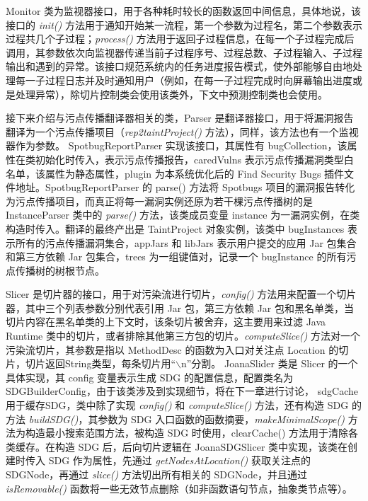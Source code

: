 Monitor 类为监视器接口，用于各种耗时较长的函数返回中间信息，具体地说，该接口的 \textit{init()} 方法用于通知开始某一流程，第一个参数为过程名，第二个参数表示过程共几个子过程；\textit{process()} 方法用于返回子过程信息，在每一个子过程完成后调用，其参数依次向监视器传递当前子过程序号、过程总数、子过程输入、子过程输出和遇到的异常。该接口规范系统内的任务进度报告模式，使外部能够自由地处理每一子过程日志并及时通知用户（例如，在每一子过程完成时向屏幕输出进度或是处理异常），除切片控制类会使用该类外，下文中预测控制类也会使用。

接下来介绍与污点传播翻译器相关的类，Parser 是翻译器接口，用于将漏洞报告翻译为一个污点传播项目（\textit{rep2taintProject()} 方法），同样，该方法也有一个监视器作为参数。 SpotbugReportParser 实现该接口，其属性有 bugCollection，该属性在类初始化时传入，表示污点传播报告，caredVulns 表示污点传播漏洞类型白名单，该属性为静态属性，plugin 为本系统优化后的 Find Security Bugs 插件文件地址。SpotbugReportParser 的 parse() 方法将 Spotbugs 项目的漏洞报告转化为污点传播项目，而真正将每一漏洞实例还原为若干棵污点传播树的是 InstanceParser 类中的 \textit{parse()} 方法，该类成员变量 instance 为一漏洞实例，在类构造时传入。翻译的最终产出是 TaintProject 对象实例，该类中 bugInstances 表示所有的污点传播漏洞集合，appJars 和 libJars 表示用户提交的应用 Jar 包集合和第三方依赖 Jar 包集合，trees 为一组键值对，记录一个 bugInstance 的所有污点传播树的树根节点。

Slicer 是切片器的接口，用于对污染流进行切片，\textit{config()} 方法用来配置一个切片器，其中三个列表参数分别代表引用 Jar 包，第三方依赖 Jar 包和黑名单类，当切片内容在黑名单类的上下文时，该条切片被舍弃，这主要用来过滤 Java Runtime 类中的切片，或者排除其他第三方包的切片。\textit{computeSlice()} 方法对一个污染流切片，其参数是指以 MethodDesc 的函数为入口对关注点 Location 的切片，切片返回String类型，每条切片用“$\backslash$n”分割。 JoanaSlider 类是 Slicer 的一个具体实现，其 config 变量表示生成 SDG 的配置信息，配置类名为 SDGBuilderConfig，由于该类涉及到实现细节，将在下一章进行讨论， sdgCache 用于缓存SDG，类中除了实现 \textit{config()} 和 \textit{computeSlice()} 方法，还有构造 SDG 的方法 \textit{buildSDG()}，其参数为 SDG 入口函数的函数摘要，\textit{makeMinimalScope()} 方法为构造最小搜索范围方法，被构造 SDG 时使用，clearCache() 方法用于清除各类缓存。在构造 SDG 后，后向切片逻辑在 JoanaSDGSlicer 类中实现，该类在创建时传入 SDG 作为属性，先通过 \textit{getNodesAtLocation()} 获取关注点的 SDGNode，再通过 \textit{slice()} 方法切出所有相关的 SDGNode，并且通过 \textit{isRemovable()} 函数将一些无效节点删除（如非函数语句节点，抽象类节点等）。

